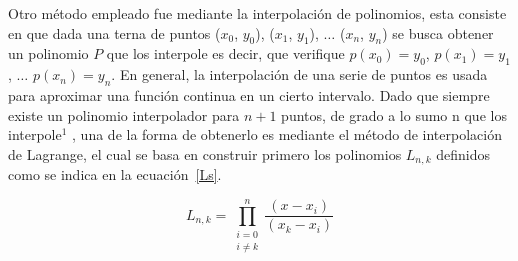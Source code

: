 \documentclass[a4paper]{article}
\begin{document}
Otro método empleado fue mediante la interpolación de polinomios, esta consiste en que dada una terna de puntos ($ x_{0} $, $ y_{0} $), ($ x_{1} $, $ y_{1} $), $ \ldots $ ($ x_{n} $, $ y_{n} $) se busca obtener un polinomio $P$ que los interpole es decir, que verifique $ p(x_{0}) =  y_{0} $, $ p(x_{1}) =  y_{1} $, $ \ldots $ $ p(x_{n}) =  y_{n} $. En general, la interpolación de una serie de puntos es usada para aproximar una función continua en un cierto intervalo. 
Dado que siempre existe un polinomio interpolador para $n+1$ puntos, de grado a lo sumo n que los interpole$^{1}$ %
, una de la forma de obtenerlo es mediante el método de interpolación de Lagrange, el cual se basa en construir primero los polinomios $ L_{n,k} $ definidos como se indica en la ecuación~\ref{Ls}.

\begin{equation}
L_{n,k}= \prod_{\substack{i=0\\i\neq k}}^{n} \frac{(x-x_{i})}{(x_{k}-x_{i})}
\label{Ls}
\end{equation}
\end{document}
